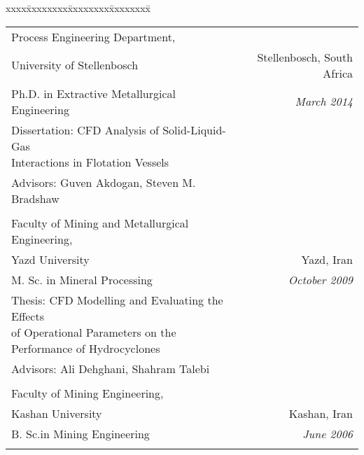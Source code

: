 \documentclass[10pt,a4]{article}
\newcommand{\quotes}[1]{``#1''}
\begin{document}
\begin{small}
\begin{tabbing}
xxxx\=xxxxxxxx\=xxxxxxxx\=xxxxxxxx\=\kill

\>\begin{tabular*}{0.97\linewidth}{l@{\extracolsep{\fill}}r}


Process Engineering Department, \\
University of Stellenbosch & Stellenbosch, South Africa\\
Ph.D. in  Extractive Metallurgical Engineering & 
{\it March 2014}\\
Dissertation: \quotes{CFD Analysis of Solid-Liquid-Gas \\Interactions in Flotation Vessels}\\
Advisors: Guven Akdogan, Steven M. Bradshaw \\
 & \\

Faculty of Mining and Metallurgical Engineering, \\
Yazd University & Yazd, Iran \\
M. Sc. in Mineral Processing &
{\it October 2009} \\
Thesis: \quotes{CFD Modelling and Evaluating the Effects \\of Operational Parameters
on the Performance of Hydrocyclones}\\
Advisors: Ali Dehghani, Shahram Talebi \\
 & \\

Faculty of Mining Engineering, \\
Kashan University & Kashan, Iran \\
B. Sc.in Mining Engineering &
{\it June 2006}\\
 & \\

\end{tabular*}
\end{tabbing}

%
%



\end{small}
\end{document}
